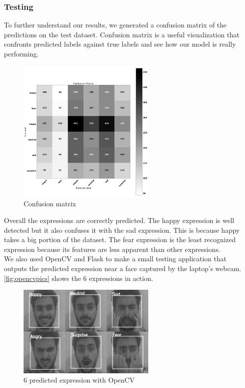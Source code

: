 \documentclass[12pt,a4paper,oneside,english]{book}
\begin{document}
\subsubsection{Testing}
To further understand our results, we generated a confusion matrix of the predictions on the test dataset. Confusion matrix is a useful visualization that confronts predicted labels against true labels and see how our model is really performing.
\begin{figure}[H]
    \centering
    \includegraphics[width=0.6\textwidth]{figures/model/graph3.jpg}
    \caption{Confusion matrix}
    \label{fig:confusionmatrix}
\end{figure}
\noindent
Overall the expressions are correctly predicted. The happy expression is well detected but it also confuses it with the sad expression. This is because happy takes a big portion of the dataset. The fear expression is the least recognized expression because its features are less apparent than other expressions.
\\
We also used OpenCV and Flask to make a small testing application that outputs the predicted expression near a face captured by the laptop's webcam. \autoref{fig:opencvpics} shows the 6 expressions in action.
\begin{figure}[H]
    \centering
    \includegraphics[width=0.6\textwidth]{figures/model/opencvpics.jpg}
    \caption{6 predicted expression with OpenCV}
    \label{fig:opencvpics}
\end{figure}
\end{document}
